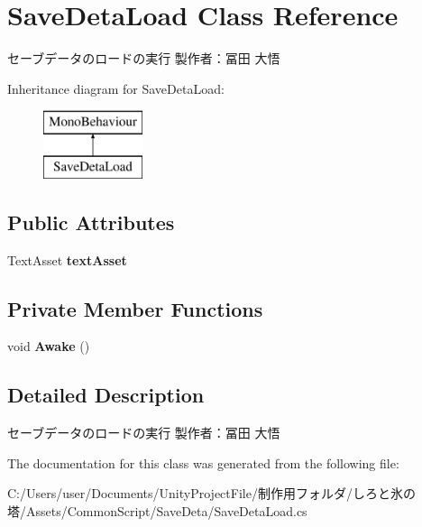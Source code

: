 \hypertarget{class_save_deta_load}{}\section{Save\+Deta\+Load Class Reference}
\label{class_save_deta_load}


セーブデータのロードの実行 製作者：冨田 大悟  


Inheritance diagram for Save\+Deta\+Load\+:\begin{figure}[H]
\begin{center}
\leavevmode
\includegraphics[height=2.000000cm]{class_save_deta_load}
\end{center}
\end{figure}
\subsection*{Public Attributes}
\begin{DoxyCompactItemize}
\item 
\mbox{\label{class_save_deta_load_ad693503f9ab25e276a979aee07e2208e}} 
Text\+Asset {\bfseries text\+Asset}
\end{DoxyCompactItemize}
\subsection*{Private Member Functions}
\begin{DoxyCompactItemize}
\item 
\mbox{\label{class_save_deta_load_ab71ff0498aaa661006b5112109e1c69d}} 
void {\bfseries Awake} ()
\end{DoxyCompactItemize}


\subsection{Detailed Description}
セーブデータのロードの実行 製作者：冨田 大悟 



The documentation for this class was generated from the following file\+:\begin{DoxyCompactItemize}
\item 
C\+:/\+Users/user/\+Documents/\+Unity\+Project\+File/制作用フォルダ/しろと氷の塔/\+Assets/\+Common\+Script/\+Save\+Deta/Save\+Deta\+Load.\+cs\end{DoxyCompactItemize}
